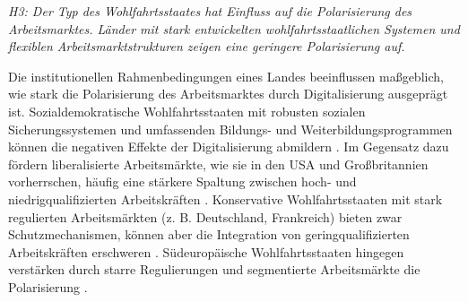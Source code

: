 \textit{H3: Der Typ des Wohlfahrtsstaates hat Einfluss auf die Polarisierung des 
Arbeitsmarktes. Länder mit stark entwickelten wohlfahrtsstaatlichen Systemen und flexiblen 
Arbeitsmarktstrukturen zeigen eine geringere Polarisierung auf.}

Die institutionellen Rahmenbedingungen eines Landes beeinflussen maßgeblich, wie stark die 
Polarisierung des Arbeitsmarktes durch Digitalisierung ausgeprägt ist. Sozialdemokratische 
Wohlfahrtsstaaten mit robusten sozialen Sicherungssystemen und umfassenden Bildungs- und 
Weiterbildungsprogrammen können die negativen Effekte der Digitalisierung abmildern 
\parencite[vgl.][S. 27–28]{espingandersen1990thethree}. Im Gegensatz dazu fördern liberalisierte 
Arbeitsmärkte, wie sie in den USA und Großbritannien vorherrschen, häufig eine stärkere 
Spaltung zwischen hoch- und niedrigqualifizierten Arbeitskräften 
\parencite[vgl.][12–13]{goodin1999thereal}. Konservative Wohlfahrtsstaaten mit stark regulierten 
Arbeitsmärkten (z. B. Deutschland, Frankreich) bieten zwar Schutzmechanismen, können aber die 
Integration von geringqualifizierten Arbeitskräften erschweren 
\parencite[vgl.][S. 78]{hall2001varieties}. Südeuropäische Wohlfahrtsstaaten hingegen verstärken 
durch starre Regulierungen und segmentierte Arbeitsmärkte die Polarisierung 
\parencite[vgl.][S. 17–37]{ferrera1996thesouthern}.
